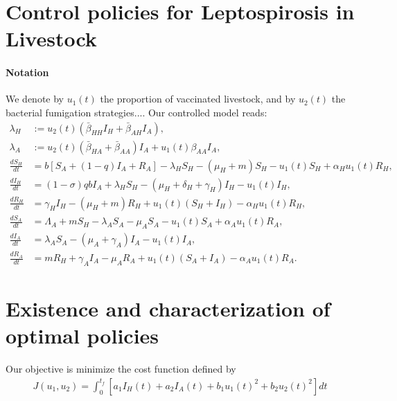\documentclass[3p,sort&compress]{elsarticle}
\DeclareRobustCommand{\1}[1]{\ensuremath \mathbbm{1}_{\{#1\}}}
\begin{document}
    \section{Control policies for Leptospirosis in Livestock}
    \paragraph{Notation}
    We denote by $u_1(t)$ the proportion of vaccinated livestock,
    and by $u_2(t)$ the bacterial fumigation strategies....
    Our controlled model reads:
    \begin{equation}\label{controlled_system}
    \begin{aligned}
        \lambda_H &:= u_2(t) (\bar{\beta}_{HH} I_H + \bar{\beta}_{AH} I_A),
        \\
        \lambda_A &:= 
            u_2(t)(\bar{\beta}_{HA} + \bar{\beta}_{AA}) I_A
        + u_1(t)\beta_{AA} I_A,
        \\
        \frac{d S_H}{dt} &=
        b \left[S_A + (1 - q) I_A + R_A\right]
        -\lambda_H S_H - (\mu_H + m) S_H 
        - u_1(t)  S_H + \alpha_H u_1(t) R_H,
        \\
        \frac{d I_H}{dt} &=
        (1 - \sigma)  q  b  I_A
        + \lambda_H S_H - (\mu_H + \delta_H + \gamma_H)I_H
        - u_1(t) I_H,
        \\
        \frac{d R_H}{dt} &=
        \gamma_H I_H - (\mu_H + m) R_H
        + u_1(t) (S_H + I_H) - \alpha_H u_1(t) R_H,
        \\
        \frac{dS_A}{dt} &=
        \Lambda_A + m S_H - \lambda_A S_A - \mu_A S_A
        - u_1(t) S_A + \alpha_A u_1(t) R_A,
        \\
        \frac{d I_A}{dt} &=
        \lambda_A S_A - (\mu_A + \gamma_A)   I_A
        - u_1(t) I_A,
        \\
        \frac{dR_A}{dt} &=
        m R_H + \gamma_A I_A - \mu_A R_A
        + u_1(t) (S_A + I_A) - \alpha_A u_1(t) R_A.
    \end{aligned}
\end{equation}    
    

    \section{Existence and characterization of optimal policies}
    Our objective is minimize the cost function defined by
    \begin{equation}\label{cost_function}
        \begin{aligned}
        J(u_{1},u_{2}) = \int_{0}^{t_{f}}\left[a_{1}I_{H}(t) + a_{2}I_{A}(t) + b_{1}u_{1}(t)^2 + b_{2}u_{2}(t)^2\right]dt
        \end{aligned}
    \end{equation}
    
\end{document}
